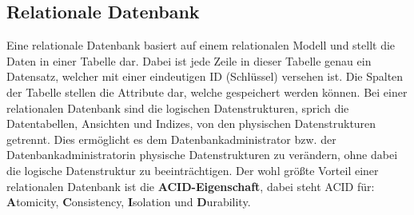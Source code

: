 \subsection{Relationale Datenbank}
Eine relationale Datenbank basiert auf einem relationalen Modell und stellt die Daten in einer Tabelle dar. Dabei ist jede Zeile in dieser Tabelle genau ein Datensatz, welcher mit einer eindeutigen ID (Schlüssel) versehen ist. Die Spalten der Tabelle stellen die Attribute dar, welche gespeichert werden können. Bei einer relationalen Datenbank sind die logischen Datenstrukturen, sprich die Datentabellen, Ansichten und Indizes, von den physischen Datenstrukturen getrennt. Dies ermöglicht es dem Datenbankadministrator bzw. der Datenbankadministratorin physische Datenstrukturen zu verändern, ohne dabei die logische Datenstruktur zu beeinträchtigen. 
\newline
Der wohl größte Vorteil einer relationalen Datenbank ist die \textbf{ACID-Eigenschaft}, dabei steht ACID für: \textbf{A}tomicity, \textbf{C}onsistency, \textbf{I}solation und \textbf{D}urability.

